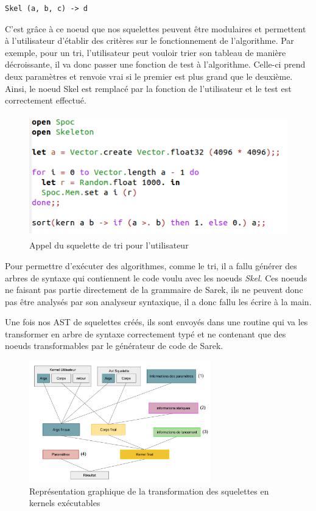 \documentclass{report}
\begin{document}
\begin{lstlisting}
Skel (a, b, c) -> d
\end{lstlisting}

C'est grâce à ce noeud que nos squelettes peuvent être modulaires et permettent à l'utilisateur d'établir des critères sur le fonctionnement de l'algorithme. Par exemple, pour un tri, l'utilisateur peut vouloir trier son tableau de manière décroissante, il va donc passer une fonction de test à l'algorithme. Celle-ci prend deux paramètres et renvoie vrai si le premier est plus grand que le deuxième. Ainsi, le noeud Skel est remplacé par la fonction de l'utilisateur et le test est correctement effectué. 

\begin{figure}[!h]
\begin{center}
\includegraphics[height=150pt]{images_finales/sort.png}
\end{center}
\caption{Appel du squelette de tri pour l'utilisateur}
\label{test5}
\end{figure}

Pour permettre d'exécuter des algorithmes, comme le tri, il a fallu générer des arbres de syntaxe qui contiennent le code voulu avec les noeuds \textit{Skel}. Ces noeuds ne faisant pas partie directement de la grammaire de Sarek, ils ne peuvent donc pas être analysés par son analyseur syntaxique, il a donc fallu les écrire à la main. \newline

Une fois nos AST de squelettes créés, ils sont envoyés dans une routine qui va les transformer en arbre de syntaxe correctement typé et ne contenant que des noeuds transformables par le générateur de code de Sarek.\newline

\begin{figure}[!h]
\begin{center}
\includegraphics[height=150pt]{images_finales/fonctionnement_skel.png}
\end{center}
\caption{Représentation graphique de la transformation des squelettes en kernels exécutables}
\label{test6}
\end{figure}
\end{document}
